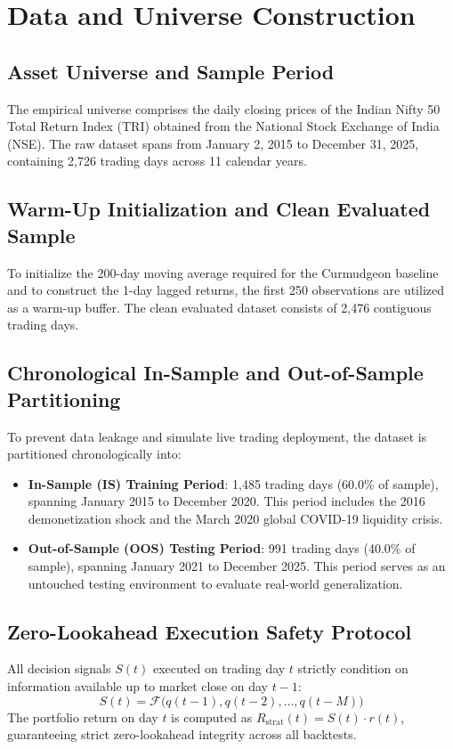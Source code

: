 \section{Data and Universe Construction}

\subsection{Asset Universe and Sample Period}
The empirical universe comprises the daily closing prices of the Indian Nifty 50 Total Return Index (TRI) obtained from the National Stock Exchange of India (NSE). The raw dataset spans from January 2, 2015 to December 31, 2025, containing 2,726 trading days across 11 calendar years.

\subsection{Warm-Up Initialization and Clean Evaluated Sample}
To initialize the 200-day moving average required for the Curmudgeon baseline and to construct the 1-day lagged returns, the first 250 observations are utilized as a warm-up buffer. The clean evaluated dataset consists of 2,476 contiguous trading days.

\subsection{Chronological In-Sample and Out-of-Sample Partitioning}
To prevent data leakage and simulate live trading deployment, the dataset is partitioned chronologically into:
\begin{itemize}
    \item \textbf{In-Sample (IS) Training Period}: 1,485 trading days (60.0\% of sample), spanning January 2015 to December 2020. This period includes the 2016 demonetization shock and the March 2020 global COVID-19 liquidity crisis.
    \item \textbf{Out-of-Sample (OOS) Testing Period}: 991 trading days (40.0\% of sample), spanning January 2021 to December 2025. This period serves as an untouched testing environment to evaluate real-world generalization.
\end{itemize}

\subsection{Zero-Lookahead Execution Safety Protocol}
All decision signals $S(t)$ executed on trading day $t$ strictly condition on information available up to market close on day $t-1$:
\begin{equation}
    S(t) = \mathcal{F}\Big( q(t-1), q(t-2), \dots, q(t-M) \Big)
\end{equation}
The portfolio return on day $t$ is computed as $R_{\text{strat}}(t) = S(t) \cdot r(t)$, guaranteeing strict zero-lookahead integrity across all backtests.
